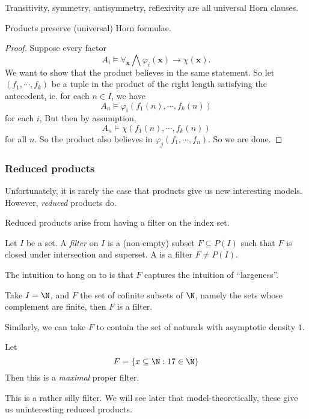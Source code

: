 \documentclass[a4paper]{article}
\begin{document}
\begin{eg}
  Transitivity, symmetry, antisymmetry, reflexivity are all universal Horn clauses.
\end{eg}

\begin{prop}
  Products preserve (universal) Horn formulae.
\end{prop}

\begin{proof}
  Suppose every factor
  \[
    A_i \vDash \forall_{\mathbf{x}} \bigwedge \varphi_i(\mathbf{x}) \to \chi(\mathbf{x}).
  \]
  We want to show that the product believes in the same statement. So let $(f_1, \cdots, f_k)$ be a tuple in the product of the right length satisfying the antecedent, ie. for each $n \in I$, we have
  \[
    A_n \vDash \varphi_i (f_1(n), \cdots, f_k(n))
  \]
  for each $i$, But then by assumption,
  \[
    A_n \vDash \chi(f_1(n), \cdots, f_k(n))
  \]
  for all $n$. So the product also believes in $\varphi_j(f_1, \cdots, f_n)$. So we are done.
\end{proof}

\subsubsection*{Reduced products}
Unfortunately, it is rarely the case that products give us new interesting models. However, \emph{reduced} products do.

Reduced products arise from having a filter on the index set.
\begin{defi}[Filter]
  Let $I$ be a set. A \emph{filter} on $I$ is a (non-empty) subset $F \subseteq P(I)$ such that $F$ is closed under intersection and superset. A  is a filter $F \not= P(I)$.
\end{defi}

The intuition to hang on to is that $F$ captures the intuition of ``largeness''.
\begin{eg}
  Take $I = \N$, and $F$ the set of cofinite subsets of $\N$, namely the sets whose complement are finite, then $F$ is a filter.

  Similarly, we can take $F$ to contain the set of naturals with asymptotic density $1$.
\end{eg}

\begin{eg}
  Let
  \[
    F = \{x \subseteq \N: 17 \in \N\}
  \]
  Then this is a \emph{maximal} proper filter.
\end{eg}
This is a rather silly filter. We will see later that model-theoretically, these give us uninteresting reduced products.
\end{document}
